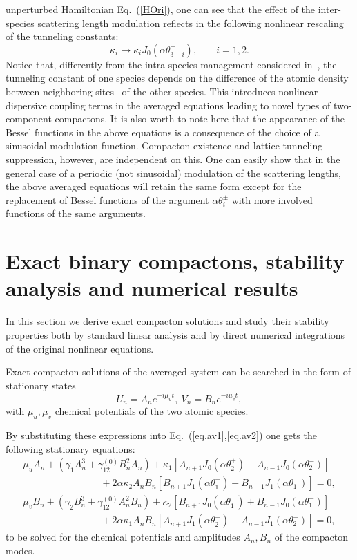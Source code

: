 \documentclass[12pt]{iopart}
\begin{document}
unperturbed Hamiltonian Eq.~(\ref{HOri}), one can see that the effect
of the inter-species scattering length modulation reflects  in the following nonlinear
rescaling of the tunneling constants:
\begin{equation}
\kappa_{i}\rightarrow\kappa_{i}J_{0}(\alpha\theta_{3-i}^{+}),\;\;\;\;\;\;\;i=1,2.\label{rescaling}
\end{equation}
Notice that, differently from the intra-species management considered
in~\cite{AHSU}, the tunneling constant of one species depends
on the difference of the atomic density between neighboring sites~\cite{GMH,AKS}
of the other species. This introduces nonlinear dispersive coupling
terms in the averaged equations leading  to novel types of two-component
compactons. It is also worth to note here that the appearance of the
Bessel functions in the above equations is a consequence of the choice of a sinusoidal
modulation function. Compacton existence  and
lattice tunneling suppression, however, are independent on this. One can easily show that in the general case of a periodic (not sinusoidal) modulation of the scattering lengths, the above averaged  equations
will retain the same form except for the replacement of Bessel functions of the argument $\alpha\theta_{i}^{\pm}$ with more involved functions of the same arguments.

\section{Exact binary compactons, stability analysis and numerical results}
In this section we derive exact compacton solutions and study their  stability properties both by standard linear analysis and by direct numerical integrations of the original nonlinear equations.

Exact compacton solutions of the averaged system can be searched in the form of stationary states
\begin{equation}
U_{n}=A_{n}e^{-i\mu_{u}t},\ V_{n}=B_{n}e^{-i\mu_{v}t},
\end{equation}
with $\mu_{u},\mu_{v}$ chemical potentials of the two atomic species.

By substituting these expressions into Eq.~(\ref{eq.av1},\ref{eq.av2})
one gets the following stationary equations:
\begin{eqnarray}
\mu_{u}A_{n}+(\gamma_{1}A_{n}^{3}+\gamma_{12}^{(0)}B_{n}^{2}A_{n})+\kappa_{1}[A_{n+1}J_{0}(\alpha\theta_{2}^{+})+
A_{n-1}J_{0}(\alpha\theta_{2}^{-})] \nonumber  \\ \qquad\qquad\qquad\quad\quad + 2\alpha\kappa_{2}A_{n}B_{n}[B_{n+1}J_{1}(\alpha\theta_{1}^{+})+B_{n-1}J_{1}(\alpha\theta_{1}^{-})]=0,\label{mubg1} \\
\mu_{v}B_{n}+(\gamma_{2}B_{n}^{3}+\gamma_{12}^{(0)}A_{n}^{2}B_{n})+\kappa_{2}[B_{n+1}J_{0}(\alpha\theta_{1}^{+})+
B_{n-1}J_{0}(\alpha\theta_{1}^{-})] \nonumber \\ \qquad\qquad\qquad\quad\quad + 2\alpha\kappa_{1}A_{n}B_{n}[A_{n+1}J_{1}(\alpha\theta_{2}^{+})+A_{n-1}J_{1}(\alpha\theta_{2}^{-})]=0, \label{mubg2}
\end{eqnarray}
to be solved for the chemical potentials and amplitudes $A_{n},B_{n}$
of the compacton modes.
\end{document}
